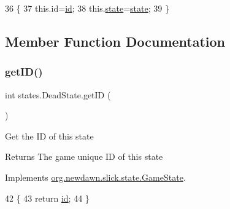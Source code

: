 \begin{DoxyCode}
36                             \{
37         this.\textcolor{keywordtype}{id}=\mbox{\hyperlink{classstates_1_1_dead_state_af4562c02a3bcac59678cfd1d540add79}{id}};
38         this.\mbox{\hyperlink{classstates_1_1_dead_state_a19351574a15993ba884dba664b03cc1e}{state}}=\mbox{\hyperlink{classstates_1_1_dead_state_a19351574a15993ba884dba664b03cc1e}{state}};
39     \}
\end{DoxyCode}


\subsection{Member Function Documentation}
\mbox{\label{classstates_1_1_dead_state_aed9ba185773a1be650305bd8c8d00a20}} 
\subsubsection{\texorpdfstring{get\+I\+D()}{getID()}}
{\footnotesize\ttfamily int states.\+Dead\+State.\+get\+ID (\begin{DoxyParamCaption}{ }\end{DoxyParamCaption})\hspace{0.3cm}{\ttfamily [inline]}}

Get the ID of this state

\begin{DoxyReturn}{Returns}
The game unique ID of this state 
\end{DoxyReturn}


Implements \mbox{\hyperlink{interfaceorg_1_1newdawn_1_1slick_1_1state_1_1_game_state_a54f2bc6a91feaf0614a5ef19f1d03313}{org.\+newdawn.\+slick.\+state.\+Game\+State}}.


\begin{DoxyCode}
42                        \{
43         \textcolor{keywordflow}{return} \mbox{\hyperlink{classstates_1_1_dead_state_af4562c02a3bcac59678cfd1d540add79}{id}};
44     \}
\end{DoxyCode}
\mbox{\label{classstates_1_1_dead_state_a0ef2cdab84227544109b871136e629eb}} 
